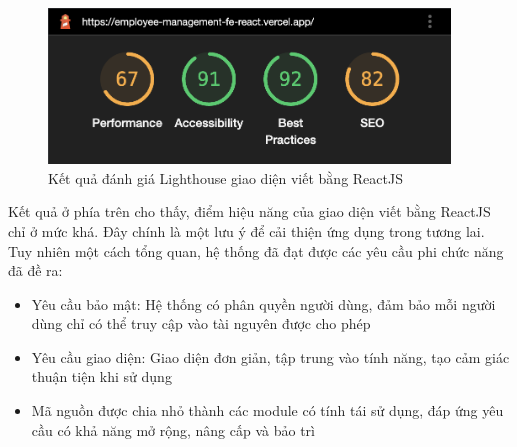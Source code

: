 \documentclass[../DoAn.tex]{subfiles}
\begin{document}
\begin{figure}[H]
    \centering
    \includegraphics[width=0.95\textwidth]{Hinhve/LightHouseReact.png}
    \caption{Kết quả đánh giá Lighthouse giao diện viết bằng ReactJS}
\end{figure}

Kết quả ở phía trên cho thấy, điểm hiệu năng của giao diện viết bằng ReactJS chỉ ở mức khá. Đây chính là một lưu ý để cải thiện ứng dụng trong tương lai. Tuy nhiên một cách tổng quan, hệ thống đã đạt được các yêu cầu phi chức năng đã đề ra: 

\begin{itemize}
    \item Yêu cầu bảo mật: Hệ thống có phân quyền người dùng, đảm bảo mỗi người dùng chỉ có thể truy cập vào tài nguyên được cho phép
    \item Yêu cầu giao diện: Giao diện đơn giản, tập trung vào tính năng, tạo cảm giác thuận tiện khi sử dụng
    \item Mã nguồn được chia nhỏ thành các module có tính tái sử dụng, đáp ứng yêu cầu có khả năng mở rộng, nâng cấp và bảo trì
\end{itemize}
\end{document}
